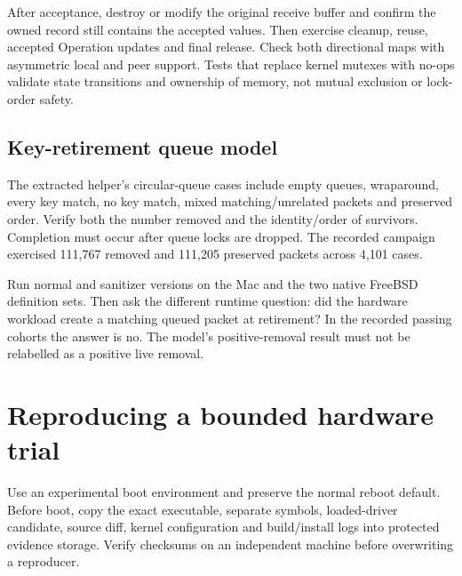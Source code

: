 \documentclass[11pt,letterpaper,oneside]{article}
\begin{document}
After acceptance, destroy or modify the original receive buffer and confirm the owned record still contains the accepted values. Then exercise cleanup, reuse, accepted Operation updates and final release. Check both directional maps with asymmetric local and peer support. Tests that replace kernel mutexes with no-ops validate state transitions and ownership of memory, not mutual exclusion or lock-order safety.

\subsection{Key-retirement queue model}
The extracted helper's circular-queue cases include empty queues, wraparound, every key match, no key match, mixed matching/unrelated packets and preserved order. Verify both the number removed and the identity/order of survivors. Completion must occur after queue locks are dropped. The recorded campaign exercised 111,767 removed and 111,205 preserved packets across 4,101 cases.

Run normal and sanitizer versions on the Mac and the two native FreeBSD definition sets. Then ask the different runtime question: did the hardware workload create a matching queued packet at retirement? In the recorded passing cohorts the answer is no. The model's positive-removal result must not be relabelled as a positive live removal.

\section{Reproducing a bounded hardware trial}
Use an experimental boot environment and preserve the normal reboot default. Before boot, copy the exact executable, separate symbols, loaded-driver candidate, source diff, kernel configuration and build/install logs into protected evidence storage. Verify checksums on an independent machine before overwriting a reproducer.
\end{document}
